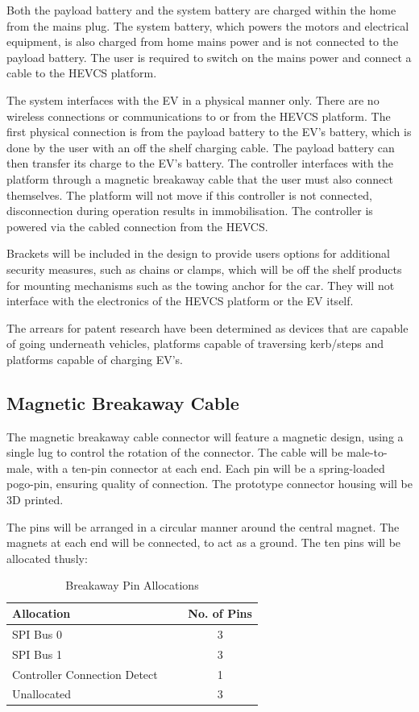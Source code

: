 \documentclass [12pt]{article}
\begin{document}
Both the payload battery and the system battery are charged within the home from the mains plug. The system battery, which powers the motors and electrical equipment, is also charged from home mains power and is not connected to the payload battery. The user is required to switch on the mains power and connect a cable to the HEVCS platform.

The system interfaces with the EV in a physical manner only. There are no wireless connections or communications to or from the HEVCS platform. The first physical connection is from the payload battery to the EV’s battery, which is done by the user with an off the shelf charging cable. The payload battery can then transfer its charge to the EV’s battery. The controller interfaces with the platform through a magnetic breakaway cable that the user must also connect themselves. The platform will not move if this controller is not connected, disconnection during operation results in immobilisation. The controller is powered via the cabled connection from the HEVCS. 

Brackets will be included in the design to provide users options for additional security measures, such as chains or clamps, which will be off the shelf products for mounting mechanisms such as the towing anchor for the car. They will not interface with the electronics of the HEVCS platform or the EV itself. 

The arrears for patent research have been determined as devices that are capable of going underneath vehicles, platforms capable of traversing kerb/steps and platforms capable of charging EV’s. 

\subsection{Magnetic Breakaway Cable}

The magnetic breakaway cable connector will feature a magnetic design, using a single lug to control the rotation of the connector. The cable will be male-to-male, with a ten-pin connector at each end. Each pin will be a spring-loaded pogo-pin, ensuring quality of connection. The prototype connector housing will be 3D printed.

The pins will be arranged in a circular manner around the central magnet. The magnets at each end will be connected, to act as a ground. The ten pins will be allocated thusly:

\begin{table}[H]
    \centering
    \setlength{\arrayrulewidth}{1.5pt}
    \begin{tabular}{|p{0.7\linewidth}|c|}
    \hline
    \cellcolor{gray!40}Allocation & \cellcolor{gray!40}No. of Pins\\
    \hline
    SPI Bus 0 & 3 \\
    \hline
    SPI Bus 1 & 3 \\
    \hline
    Controller Connection Detect & 1 \\
    \hline
    Unallocated & 3 \\
   \hline
    \end{tabular}
    \caption{Breakaway Pin Allocations}
    \label{table:breakaway_pin_allocations}
\end{table}
\end{document}

